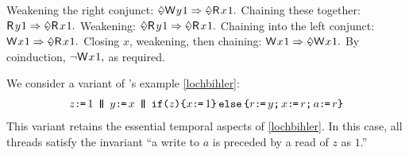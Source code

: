 Weakening the right conjunct: %
\begin{math}
  \once\DW{y}{1}\Rightarrow\once\DR{x}{1}.
\end{math}
Chaining these together: %
\begin{math}
  \DR{y}{1} \Rightarrow \once\DR{x}{1}.
\end{math}
Weakening:  %
\begin{math}
  \once\DR{y}{1} \allowbreak\Rightarrow \once\DR{x}{1}. 
\end{math}
Chaining into the left conjunct:  %
\begin{math}
  \DW{x}{1} \Rightarrow \once\DR{x}{1}. 
\end{math}
Closing $x$, 
weakening, 
then chaining: %
\begin{math}
  \DW{x}{1} \Rightarrow \once\DW{x}{1}. 
\end{math}
By coinduction, 
\begin{math}
  \lnot\DW{x}{1},
\end{math}
as required.

We consider a variant of
\citeauthor{DBLP:journals/toplas/Lochbihler13}'s example \eqref{lochbihler}:
\begin{align*}
  \label{alan}
  z\texttt{:}\mkern-1mu\texttt{=}\,1
  \,\mathbin{\texttt{\textbf{|}}\mkern-6mu\texttt{\textbf{|}}}\,
    y\texttt{:}\mkern-1mu\texttt{=}\, x
  \,\mathbin{\texttt{\textbf{|}}\mkern-6mu\texttt{\textbf{|}}}\,
    \texttt{if}\allowbreak\texttt{(}z\texttt{)}\allowbreak\texttt{\{} x\texttt{:}\mkern-1mu\texttt{=}\,1 \texttt{\}}\,\allowbreak\texttt{else}\allowbreak\,\texttt{\{} r\texttt{:}\mkern-1mu\texttt{=}\, y \texttt{;}\,\allowbreak x\texttt{:}\mkern-1mu\texttt{=}\, r \texttt{;}\,\allowbreak a\texttt{:}\mkern-1mu\texttt{=}\, r \texttt{\}}
\end{align*}
This variant retains the essential temporal aspects of \eqref{lochbihler}.
In this case, all threads satisfy the invariant ``a write to $a$ is preceded
by a read of $z$ as $1$.''


